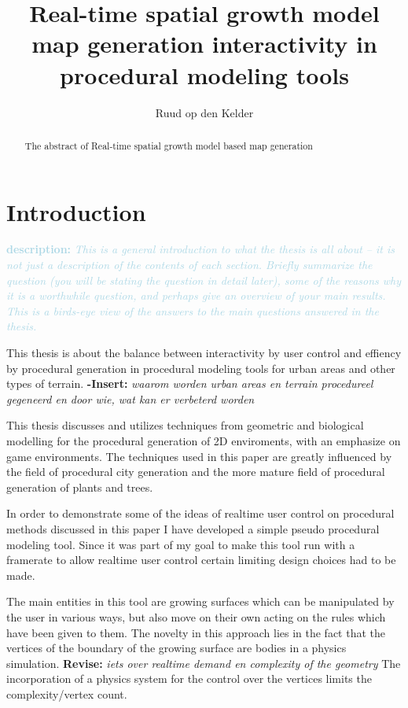 \documentclass{article}
\title{Real-time spatial growth model map generation \small{interactivity in procedural modeling tools}}
\author{Ruud op den Kelder}
\newcommand{\revise}[1]{\textcolor{myOrange}{\textbf{\newline Revise: }\it{#1}}}
\newcommand{\desc}[1]{\textcolor{lightblue}{\textbf{\newline description: }\it{#1} \newline}}
\newcommand{\voegtoe}[1]{\textcolor{MyDarkGreen}{\textbf{-Insert: }\it{#1}}}
\begin{document}
\maketitle

\begin{abstract}
The abstract of Real-time spatial growth model based map generation
\end{abstract}
\newpage 

\tableofcontents
\newpage 

\section{Introduction}

\desc{This is a general introduction to what the thesis is all about -- it is not just a description of the contents of each section. Briefly summarize the question (you will be stating the question in detail later), some of the reasons why it is a worthwhile question, and perhaps give an overview of your main results. This is a birds-eye view of the answers to the main questions answered in the thesis.}

This thesis is about the balance between interactivity by user control and effiency by procedural generation in procedural modeling tools for urban areas and other types of terrain. \voegtoe{waarom worden urban areas en terrain procedureel gegeneerd en door wie, wat kan er verbeterd worden}


This thesis discusses and utilizes techniques from geometric and biological modelling for the procedural generation of 2D enviroments, with an emphasize on game environments. The techniques used in this paper are greatly influenced by the field of procedural city generation and the more mature field of procedural generation of plants and trees. 

In order to demonstrate some of the ideas of realtime user control on procedural methods discussed in this paper I have developed a simple pseudo procedural modeling tool. Since it was part of my goal to make this tool run with a framerate to allow realtime user control certain limiting design choices had to be made.  

The main entities in this tool are growing surfaces which can be manipulated by the user in various ways, but also move on their own acting on the rules which have been given to them. The novelty in this approach lies in the fact that the vertices of the boundary of the growing surface are bodies in a physics simulation. \revise{iets over realtime demand en complexity of the geometry}
The incorporation of a physics system for the control over the vertices limits the complexity/vertex count.  
\end{document}
